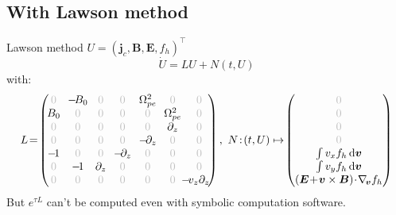 \documentclass{beamer}
\newcommand{\Mvb}[1]{\boldsymbol{#1}}
\begin{document}

\newcommand{\gz}{\textcolor{gris!50}{0}}

\subsection{With Lawson method}
\begin{frame}{Lawson method}
  $U = \left(\Mvb{j}_c , \Mvb{B} , \Mvb{E} , f_h \right)^\top$
  $$\dot{U} = LU + N(t,U)$$
  with:
  $$
    L \!=\!\begin{pmatrix}
      \gz      & \!-\!B_0\! & \gz            &  \gz              &  \!\Omega_{pe}^2\! & \gz               & \gz \\ 
      \!B_0\!  &  \gz       & \gz            &  \gz              &  \gz               & \!\Omega_{pe}^2\! & \gz \\
      \gz      &  \gz       & \gz            &  \gz              &  \gz               & \partial_z        & \gz \\ 
      \gz      &  \gz       & \gz            &  \gz              & \!-\!\partial_z\!  & \gz               & \gz \\ 
      \!-\!1\! &  \gz       & \gz            & \!-\!\partial_z\! &  \gz               & \gz               & \gz \\ 
      \gz      & \!-\!1\!   & \!\partial_z\! &  \gz              &  \gz               & \gz               & \gz \\ 
      \gz      &  \gz       & \gz            &  \gz              &  \gz               & \gz               & \!\!\!\!\!-\!v_z\partial_z\! \\ 
    \end{pmatrix}
    ,\ 
    N\!:\!(t,U)\mapsto\!\begin{pmatrix}
      \gz \\
      \gz \\
      \gz \\
      \gz \\
      \int v_xf_h\dd{\Mvb{v}} \\
      \int v_yf_h\dd{\Mvb{v}} \\
      (\Mvb{E}\!+\!\Mvb{v}\times\Mvb{B})\!\cdot\!\nabla_{\!\Mvb{v}}f_h
    \end{pmatrix}
  $$
  But $e^{\tau L}$ can't be computed even with symbolic computation software.
\end{frame}
\end{document}
